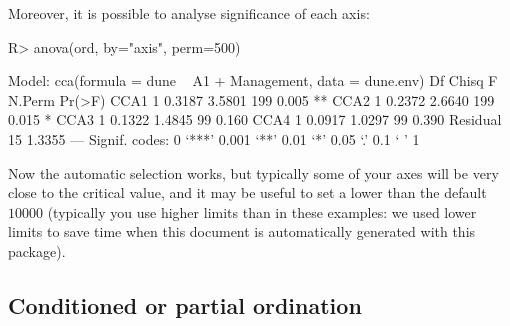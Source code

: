 \documentclass[article,nojss]{jss}
\begin{document}
Moreover, it is possible to analyse significance of each axis:
\begin{Schunk}
\begin{Sinput}
R> anova(ord, by="axis", perm=500)
\end{Sinput}
\begin{Soutput}
Model: cca(formula = dune ~ A1 + Management, data = dune.env)
         Df  Chisq      F N.Perm Pr(>F)   
CCA1      1 0.3187 3.5801    199  0.005 **
CCA2      1 0.2372 2.6640    199  0.015 * 
CCA3      1 0.1322 1.4845     99  0.160   
CCA4      1 0.0917 1.0297     99  0.390   
Residual 15 1.3355                        
---
Signif. codes:  0 ‘***’ 0.001 ‘**’ 0.01 ‘*’ 0.05 ‘.’ 0.1 ‘ ’ 1 
\end{Soutput}
\end{Schunk}
Now the automatic selection works, but typically some of your axes
will be very close to the critical value, and it may be useful to set
a lower  than the default $10000$ (typically you use
higher limits than in these examples: we used lower limits to save
time when this document is automatically generated with this package).

\subsection{Conditioned or partial ordination}
\end{document}
